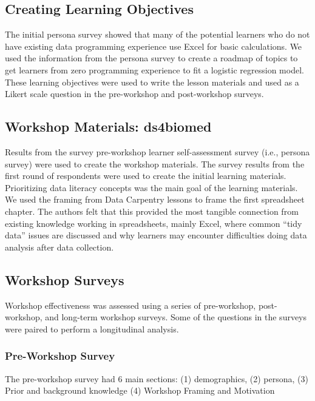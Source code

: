 \documentclass[030-workshop.tex]{subfiles}
\begin{document}
  \subsection{Creating Learning Objectives}

    The initial persona survey showed that many of the potential learners who do not
    have existing data programming experience use Excel for basic calculations.
    We used the information from the persona survey to create a roadmap of topics
    to get learners from zero programming experience to fit a logistic regression model.
    These learning objectives were used to write the lesson materials
    and used as a Likert scale question in the pre-workshop and post-workshop surveys.

  \subsection{Workshop Materials: ds4biomed}

    Results from the survey pre-workshop learner self-assessment survey (i.e., persona survey)
    were used to create the workshop materials.
    The survey results from the first round of respondents were used to create the initial
    learning materials.
    Prioritizing data literacy concepts was the main goal of the learning materials.
    We used the framing from Data Carpentry lessons to frame the first spreadsheet chapter.
    The authors felt that this provided the most tangible connection from existing knowledge
    working in spreadsheets, mainly Excel,
    where common ``tidy data'' issues are discussed and why learners may encounter difficulties
    doing data analysis after data collection.

  \subsection{Workshop Surveys}

    Workshop effectiveness was assessed using a series of pre-workshop, post-workshop, and long-term workshop surveys.
    Some of the questions in the surveys were paired to perform a longitudinal analysis.

  \subsubsection{Pre-Workshop Survey}

      The pre-workshop survey had 6 main sections:
      (1) demographics,
      (2) persona,
      (3) Prior and background knowledge
      (4) Workshop Framing and Motivation
\end{document}
